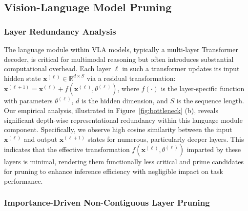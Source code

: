 \subsection{Vision-Language Model Pruning}

\subsubsection{Layer Redundancy Analysis}


The language module within VLA models, typically a multi-layer Transformer decoder, is critical for multimodal reasoning but often introduces substantial computational overhead. Each layer $\ell$ in such a transformer updates its input hidden state $\boldsymbol{x}^{(\ell)} \in \mathbb{R}^{d \times S}$ via a residual transformation: $\boldsymbol{x}^{(\ell+1)} = \boldsymbol{x}^{(\ell)} + f(\boldsymbol{x}^{(\ell)}, \theta^{(\ell)})$, where $f(\cdot)$ is the layer-specific function with parameters $\theta^{(\ell)}$, $d$ is the hidden dimension, and $S$ is the sequence length. Our empirical analysis, illustrated in Figure~\ref{fig:bottleneck} (b), reveals significant depth-wise representational redundancy within this language module component. Specifically, we observe high cosine similarity between the input $\boldsymbol{x}^{(\ell)}$ and output $\boldsymbol{x}^{(\ell+1)}$ states for numerous, particularly deeper layers. This indicates that the effective transformation $f(\boldsymbol{x}^{(\ell)}, \theta^{(\ell)})$ imparted by these layers is minimal, rendering them functionally less critical and prime candidates for pruning to enhance inference efficiency with negligible impact on task performance. 
% 





\subsubsection{Importance-Driven Non-Contiguous Layer Pruning}

